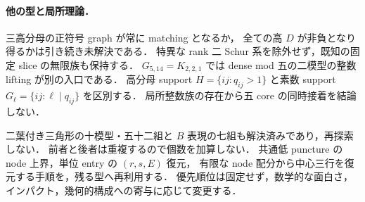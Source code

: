\paragraph{他の型と局所理論．}
三高分母の正符号 graph が常に matching となるか，
全ての高 $D$ が非負となり得るかは引き続き未解決である．
特異な rank 二 Schur 系を除外せず，既知の固定 slice の無限族も保持する．
$G_{5,14}=K_{2,2,1}$ では dense mod 五の二模型の整数 lifting が別の入口である．
高分母 support $H=\{ij:q_{ij}>1\}$ と素数 support $G_\ell=\{ij:\ell\mid q_{ij}\}$ を区別する．
局所整数族の存在から五 core の同時接着を結論しない．

二葉付き三角形の十模型・五十二組と $B$ 表現の七組も解決済みであり，再探索しない．
前者と後者は重複するので個数を加算しない．
共通低 puncture の node 上界，単位 entry の $(r,s,E)$ 復元，
有限な node 配分から中心三行を復元する手順を，残る型へ再利用する．
優先順位は固定せず，数学的な面白さ，インパクト，幾何的構成への寄与に応じて変更する．

